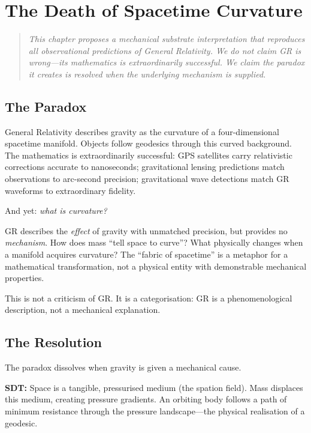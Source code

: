 \chapter{The Death of Spacetime Curvature}
\label{ch:spacetime-curvature}

\begin{quote}
\emph{This chapter proposes a mechanical substrate interpretation that reproduces all observational predictions of General Relativity. We do not claim GR is wrong---its mathematics is extraordinarily successful. We claim the paradox it creates is resolved when the underlying mechanism is supplied.}
\end{quote}

\section{The Paradox}

General Relativity describes gravity as the curvature of a four-dimensional spacetime manifold. Objects follow geodesics through this curved background. The mathematics is extraordinarily successful: GPS satellites carry relativistic corrections accurate to nanoseconds; gravitational lensing predictions match observations to arc-second precision; gravitational wave detections match GR waveforms to extraordinary fidelity.

And yet: \emph{what is curvature?}

GR describes the \emph{effect} of gravity with unmatched precision, but provides no \emph{mechanism}. How does mass ``tell space to curve''? What physically changes when a manifold acquires curvature? The ``fabric of spacetime'' is a metaphor for a mathematical transformation, not a physical entity with demonstrable mechanical properties.

This is not a criticism of GR. It is a categorisation: GR is a phenomenological description, not a mechanical explanation.


\section{The Resolution}

The paradox dissolves when gravity is given a mechanical cause.

\textbf{SDT:} Space is a tangible, pressurised medium (the spation field). Mass displaces this medium, creating pressure gradients. An orbiting body follows a path of minimum resistance through the pressure landscape---the physical realisation of a geodesic.


